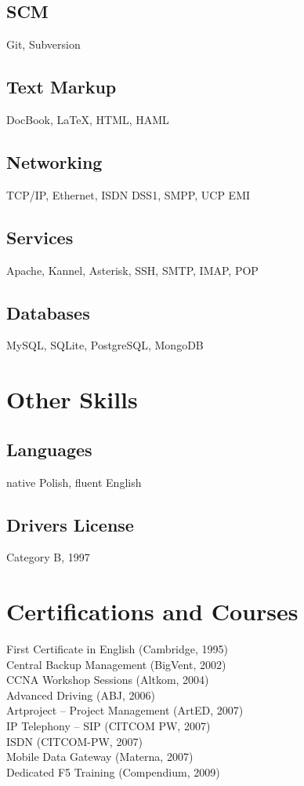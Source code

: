 \documentclass[9pt,a4paper,twocolumn]{extarticle}
\begin{document}
\subsection*{SCM}
Git, Subversion
\subsection*{Text Markup}
DocBook, \LaTeX, HTML, HAML
\subsection*{Networking}
TCP/IP, Ethernet, ISDN DSS1, SMPP, UCP EMI
\subsection*{Services}
Apache, Kannel, Asterisk, SSH, SMTP, IMAP, POP
\subsection*{Databases}
MySQL, SQLite, PostgreSQL, MongoDB

\section*{Other Skills}
\subsection*{Languages}
native Polish, fluent English
\subsection*{Drivers License}
Category B, 1997

\section*{Certifications and Courses}

First Certificate in English (Cambridge, 1995)\\
Central Backup Management (BigVent, 2002)\\
CCNA Workshop Sessions (Altkom, 2004)\\
Advanced Driving (ABJ, 2006)\\
Artproject – Project Management (ArtED, 2007)\\
IP Telephony – SIP (CITCOM PW, 2007)\\
ISDN (CITCOM-PW, 2007)\\
Mobile Data Gateway (Materna, 2007)\\
Dedicated F5 Training (Compendium, 2009)
\end{document}
